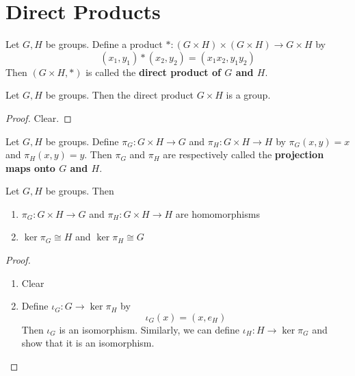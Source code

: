 \documentclass{book}
\begin{document}
	
	
	
	
	
	
	
	
	
	
	
	
	
	
	
	
	
	
	
	
	
	
	
	
	
	
	\section{Direct Products}
	
	\begin{defn}
		Let $G,H$ be groups. Define a product $*:(G \times H) \times (G \times H) \rightarrow G \times H$ by 
		$$(x_1,y_1) * (x_2, y_2) = (x_1x_2, y_1y_2)$$
		Then $(G \times H, *)$ is called the \textbf{direct product of $G$ and $H$}.
	\end{defn}	
	
	\begin{ex}
		 Let $G,H$ be groups. Then the direct product $G \times H$ is a group.
	\end{ex}
	\begin{proof}
		Clear.
	\end{proof}
	
	\begin{defn} 
		Let $G,H$ be groups. Define $\pi_G :G \times H \rightarrow G$ and $\pi_H :G \times H \rightarrow H$ by $\pi_G(x,y) = x$ and $\pi_H(x,y) = y$.  Then $\pi_G$ and $\pi_H$ are respectively called the \textbf{projection maps onto $G$ and $H$}.
	\end{defn}	
	
	\begin{ex}
		 Let $G,H$ be groups. Then 
		\begin{enumerate}
			\item $\pi_G: G \times H \rightarrow G$ and $\pi_H : G \times H \rightarrow H$ are homomorphisms
			\item $\ker \pi_G \cong H$ and $\ker \pi_H \cong G$
		\end{enumerate}	 
	\end{ex}
	
	\begin{proof}\
		\begin{enumerate}
			\item Clear
			\item Define $\iota_G:G \rightarrow \ker \pi_H$ by $$\iota_G(x) = (x, e_H)$$ Then $\iota_G$ is an isomorphism. Similarly, we can define $\iota_H:H \rightarrow \ker \pi_G$ and show that it is an isomorphism.
		\end{enumerate}
	\end{proof}
	
\end{document}
